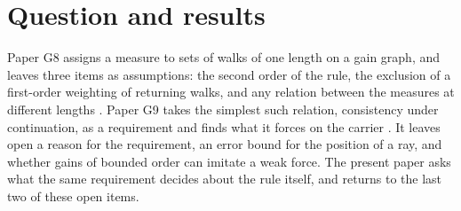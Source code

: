 \section{Question and results}

Paper G8 assigns a measure to sets of walks of one length on a gain graph, and leaves three items as assumptions: the second order of the rule, the exclusion of a first-order weighting of returning walks, and any relation between the measures at different lengths \cite{g8}. Paper G9 takes the simplest such relation, consistency under continuation, as a requirement and finds what it forces on the carrier \cite{g9}. It leaves open a reason for the requirement, an error bound for the position of a ray, and whether gains of bounded order can imitate a weak force. The present paper asks what the same requirement decides about the rule itself, and returns to the last two of these open items.


